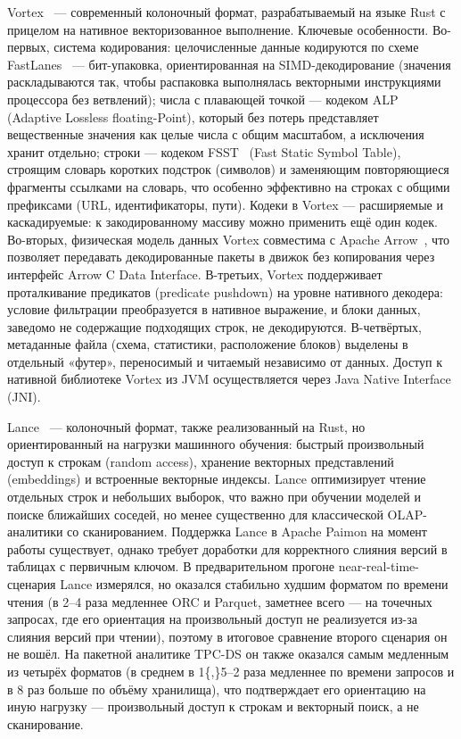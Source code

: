 Vortex~\cite{vortex-repo, vortex-docs} --- современный колоночный формат, разрабатываемый на языке Rust с
прицелом на нативное векторизованное выполнение. Ключевые особенности. Во-первых,
система кодирования: целочисленные данные кодируются по схеме FastLanes~\cite{afroozeh2023fastlanes} ---
бит-упаковка, ориентированная на SIMD-декодирование (значения раскладываются так,
чтобы распаковка выполнялась векторными инструкциями процессора без ветвлений);
числа с плавающей точкой --- кодеком ALP~\cite{afroozeh2024alp} (Adaptive Lossless floating-Point), который
без потерь представляет вещественные значения как целые числа с общим масштабом, а
исключения хранит отдельно; строки --- кодеком FSST~\cite{boncz2020fsst} (Fast Static Symbol Table),
строящим словарь коротких подстрок (символов) и заменяющим повторяющиеся фрагменты
ссылками на словарь, что особенно эффективно на строках с общими префиксами (URL,
идентификаторы, пути). Кодеки в Vortex --- расширяемые и каскадируемые: к закодированному
массиву можно применить ещё один кодек. Во-вторых, физическая модель данных Vortex
совместима с Apache Arrow~\cite{arrow-site}, что позволяет передавать декодированные пакеты в движок
без копирования через интерфейс Arrow C Data Interface. В-третьих, Vortex
поддерживает проталкивание предикатов (predicate pushdown) на уровне нативного
декодера: условие фильтрации преобразуется в нативное выражение, и блоки данных,
заведомо не содержащие подходящих строк, не декодируются. В-четвёртых, метаданные
файла (схема, статистики, расположение блоков) выделены в отдельный «футер»,
переносимый и читаемый независимо от данных. Доступ к нативной библиотеке Vortex из
JVM осуществляется через Java Native Interface (JNI).

Lance~\cite{lance-docs} --- колоночный формат, также реализованный на Rust, но
ориентированный на нагрузки машинного обучения: быстрый произвольный доступ к
строкам (random access), хранение векторных представлений (embeddings) и встроенные
векторные индексы. Lance оптимизирует чтение отдельных строк и небольших выборок,
что важно при обучении моделей и поиске ближайших соседей, но менее существенно для
классической OLAP-аналитики со сканированием. Поддержка Lance в Apache Paimon на
момент работы существует, однако требует доработки для корректного слияния версий в
таблицах с первичным ключом. В предварительном прогоне near-real-time-сценария Lance
измерялся, но оказался стабильно худшим форматом по времени чтения (в \num{2}--\num{4}
раза медленнее ORC и Parquet, заметнее всего --- на точечных запросах, где его
ориентация на произвольный доступ не реализуется из-за слияния версий при чтении),
поэтому в итоговое сравнение второго сценария он не вошёл. На пакетной аналитике
TPC-DS он также оказался самым медленным
из четырёх форматов (в среднем в \num{1{,}5}--\num{2} раза медленнее по времени
запросов и в \num{8} раз больше по объёму хранилища), что подтверждает его
ориентацию на иную нагрузку --- произвольный доступ к строкам и векторный поиск,
а не сканирование.

